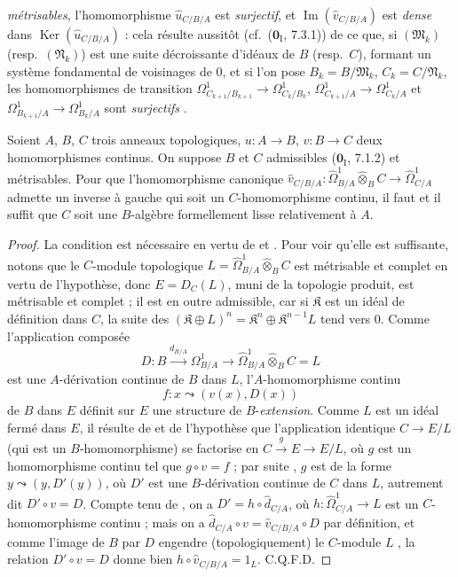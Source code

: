 \begin{env}[20.7.17]
\emph{métrisables}, l'homomorphisme $\widehat u_{C/B/A}$ est \emph{surjectif},
et $\operatorname{Im}(\widehat v_{C/B/A})$ est \emph{dense} dans
$\operatorname{Ker}(\widehat u_{C/B/A})$ : cela résulte aussitôt
(cf.\ ($\mathbf{0}_{\mathrm I}$, 7.3.1)) de ce que, si
$(\mathfrak{M}_k)$ (resp.\ $(\mathfrak{N}_k)$) est une suite décroissante
d'idéaux de $B$ (resp.\ $C$), formant un système fondamental de voisinages de
$0$, et si l'on pose $B_k=B/\mathfrak{M}_k$, $C_k=C/\mathfrak{N}_k$, les
homomorphismes de transition
$\Omega^1_{C_{k+1}/B_{k+1}}\to\Omega^1_{C_k/B_k}$,
$\Omega^1_{C_{k+1}/A}\to\Omega^1_{C_k/A}$ et
$\Omega^1_{B_{k+1}/A}\to\Omega^1_{B_k/A}$ sont \emph{surjectifs}
.
\end{env}

\begin{proposition}[20.7.18]
\label{0.20.7.18-fr}
Soient $A$, $B$, $C$ trois anneaux topologiques, $u:A\to B$, $v:B\to C$
deux homomorphismes continus. On suppose $B$ et $C$ admissibles
\textup{($\mathbf{0}_{\mathrm I}$, 7.1.2)} et métrisables. Pour que l'homomorphisme
canonique $\widehat v_{C/B/A}:\widehat{\Omega}^1_{B/A}\widehat\otimes_B C\to\widehat{\Omega}^1_{C/A}$
admette un inverse à gauche qui soit un $C$-homomorphisme continu, il faut et
il suffit que $C$ soit une $B$-algèbre formellement lisse relativement à $A$.
\end{proposition}

\begin{proof}
La condition est nécessaire en vertu de  et
. Pour voir qu'elle est suffisante, notons que le $C$-module
topologique
$L=\widehat{\Omega}^1_{B/A}\widehat\otimes_B C$ est
métrisable et
complet en vertu de l'hypothèse, donc $E=D_C(L)$, muni de la topologie produit,
est
métrisable et complet ; il est en outre admissible, car si $\mathfrak{K}$
est un idéal de définition dans $C$, la suite des
$(\mathfrak{K}\oplus L)^n=\mathfrak{K}^n\oplus\mathfrak{K}^{n-1}L$ tend vers
$0$. Comme l'application composée
\[
  D:B\xrightarrow{d_{B/A}}\Omega^1_{B/A}\to
  \widehat{\Omega}^1_{B/A}\widehat\otimes_B C=L
\]
est une $A$-dérivation continue de $B$ dans $L$, l'$A$-homomorphisme continu
\[
  f:x\leadsto(v(x),D(x))
\]
de $B$ dans $E$ définit sur $E$ une structure de $B$-\emph{extension}. Comme $L$ est
un idéal fermé dans $E$, il résulte de  et de l'hypothèse
que l'application identique $C\to E/L$ (qui est un $B$-homomorphisme) se
factorise en $C\xrightarrow{g}E\to E/L$, où $g$ est un homomorphisme continu
tel que $g\circ v=f$ ; par suite , $g$ est de la forme
$y\leadsto(y,D'(y))$, où $D'$ est une $B$-dérivation continue de $C$ dans $L$,
autrement dit $D'\circ v=D$. Compte tenu de , on a
$D'=h\circ\widehat d_{C/A}$, où
$h:\widehat{\Omega}^1_{C/A}\to L$ est un $C$-homomorphisme continu ; mais on
a $\widehat d_{C/A}\circ v=\widehat v_{C/B/A}\circ D$ par définition, et
comme l'image de $B$ par $D$ engendre (topologiquement) le $C$-module $L$
, la relation $D'\circ v=D$ donne bien
$h\circ\widehat v_{C/B/A}=1_L$. C.Q.F.D.
\end{proof}

